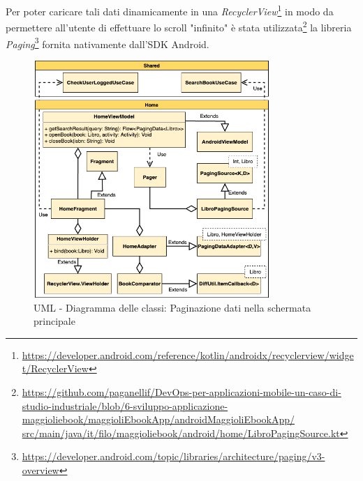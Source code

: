 Per poter caricare tali dati dinamicamente in una \textit{RecyclerView}\footnote{\href{https://developer.android.com/reference/kotlin/androidx/recyclerview/widget/RecyclerView}{https://developer.android.com/reference/kotlin/androidx/recyclerview/widget/RecyclerView}} in modo da permettere all'utente di effettuare lo scroll "infinito" è stata utilizzata\footnote{\href{https://github.com/paganellif/DevOps-per-applicazioni-mobile-un-caso-di-studio-industriale/blob/6-sviluppo-applicazione-maggioliebook/maggioliEbookApp/androidMaggioliEbookApp/src/main/java/it/filo/maggioliebook/android/home/LibroPagingSource.kt}{https://github.com/paganellif/DevOps-per-applicazioni-mobile-un-caso-di-studio-industriale/blob/6-sviluppo-applicazione-maggioliebook/maggioliEbookApp/androidMaggioliEbookApp/\\src/main/java/it/filo/maggioliebook/android/home/LibroPagingSource.kt}} la libreria \textit{Paging}\footnote{\href{https://developer.android.com/topic/libraries/architecture/paging/v3-overview}{https://developer.android.com/topic/libraries/architecture/paging/v3-overview}} fornita nativamente dall'SDK Android.

\begin{figure}[H]
    \centering
    \includegraphics[width=0.8\textwidth]{img/android-viewmodel.png}
    \caption{UML - Diagramma delle classi: Paginazione dati nella schermata principale}
    \label{android-viewmodel-png}
\end{figure}

